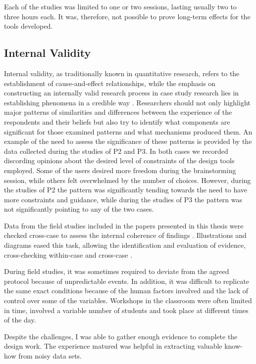 Each of the studies was limited to one or two sessions, lasting usually two to three hours each. It was, therefore, not possible to prove long-term effects for the tools developed.

\subsection{Internal Validity}
Internal validity, as traditionally known in quantitative research, refers to the establishment of cause-and-effect relationships, while the emphasis on constructing an internally valid research process in case study research lies in establishing phenomena in a credible way \autocite{riege_validity_2003}. Researchers should not only highlight major patterns of similarities and differences between the experience of the respondents and their beliefs but also try to identify what components are significant for those examined patterns and what mechanisms produced them. An example of the need to assess the significance of these patterns is provided by the data collected during the studies of P2 and P3. In both cases we recorded discording opinions about the desired level of constraints of the design tools employed. Some of the users desired more freedom during the brainstorming session, while others felt overwhelmed by the number of choices. However, during the studies of P2 the pattern was significantly tending towards the need to have more constraints and guidance, while during the studies of P3 the pattern was not significantly pointing to any of the two cases.

Data from the field studies included in the papers presented in this thesis were checked cross-case to assess the internal coherence of findings \autocite{miles_qualitative_1994}. Illustrations and diagrams eased this task, allowing the identification and evaluation of evidence, cross-checking within-case and cross-case \autocite{yin_case_2017}.

During field studies, it was sometimes required to deviate from the agreed protocol because of unpredictable events. In addition, it was difficult to replicate the same exact conditions because of the human factors involved and the lack of control over some of the variables. Workshops in the classroom were often limited in time, involved a variable number of students and took place at different times of the day.

Despite the challenges, I was able to gather enough evidence to complete the design work. The experience matured was helpful in extracting valuable know-how from noisy data sets.

